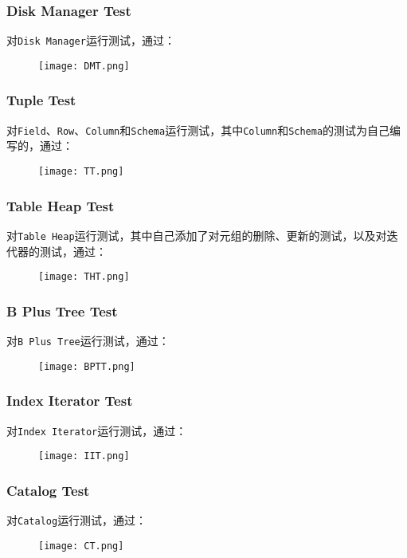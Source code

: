\documentclass[12pt]{article}
\begin{document}
    \subsubsection{Disk Manager Test}
    对\texttt{Disk Manager}运行测试，通过：
    \begin{figure}[H]
    \centering
    \texttt{[image: DMT.png]}
    \end{figure}

    \subsubsection{Tuple Test}
    对\texttt{Field}、\texttt{Row}、\texttt{Column}和\texttt{Schema}运行测试，其中\texttt{Column}和\texttt{Schema}的测试为自己编写的，通过：
    \begin{figure}[H]
    \centering
    \texttt{[image: TT.png]}
    \end{figure}

    \subsubsection{Table Heap Test}
    对\texttt{Table Heap}运行测试，其中自己添加了对元组的删除、更新的测试，以及对迭代器的测试，通过：
    \begin{figure}[H]
    \centering
    \texttt{[image: THT.png]}
    \end{figure}

    \subsubsection{B Plus Tree Test}
    对\texttt{B Plus Tree}运行测试，通过：
    \begin{figure}[H]
    \centering
    \texttt{[image: BPTT.png]}
    \end{figure}

    \subsubsection{Index Iterator Test}
    对\texttt{Index Iterator}运行测试，通过：
    \begin{figure}[H]
    \centering
    \texttt{[image: IIT.png]}
    \end{figure}

    \subsubsection{Catalog Test}
    对\texttt{Catalog}运行测试，通过：
    \begin{figure}[H]
    \centering
    \texttt{[image: CT.png]}
    \end{figure}
\end{document}
